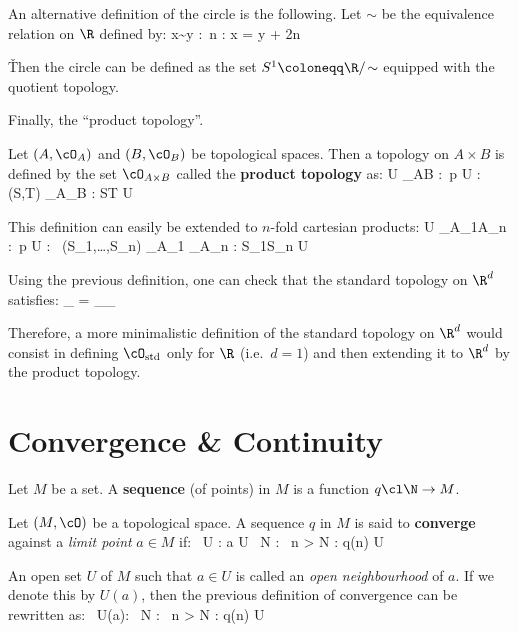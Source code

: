 An alternative definition of the circle is the following. Let $\sim$ be the equivalence relation on $\R$ defined by:
\bse
x\sim y :\eqv \exists \, n \in \Z : x = y + 2\pi n
\ese

\v

Then the circle can be defined as the set $S^1 \coloneqq \R/\!\sim$ equipped with the quotient topology.
\ee

Finally, the ``product topology''.

Let $(A,\cO_A)$ and $(B,\cO_B)$ be topological spaces. Then a topology on $A\times B$ is defined by the set
$\cO_{A\times B}$ called the \textbf{product topology} as:
\bse
U \in \cO_{A\times B} :\eqv \forall \, p \in U : \exists \, (S,T) \in \cO_A\times \cO_B : S\times T \se U
\ese
\ed

This definition can easily be extended to $n$-fold cartesian products:
\bse
U \in \cO_{A_1\times \cdots \times A_n} :\eqv \forall \, p \in U : \exists \, (S_1,\ldots,S_n) \in \cO_{A_1}\times
\cdots \times \cO_{A_n} : S_1\times \cdots\times S_n \se U
\ese

Using the previous definition, one can check that the standard topology on $\R^d$ satisfies:
\bse
\cO_ = \cO_{\underbrace{\scriptstyle \R\times\R\times\cdots\times\R}_}
\ese

Therefore, a more minimalistic definition of the standard topology on $\R^d$ would consist in defining
$\cO_\mathrm{std}$ only for $\R$ (i.e.\ $d=1$) and then extending it to $\R^d$ by the product topology.

\section{Convergence \& Continuity}

\bd [Sequence]
Let $M$ be a set. A \textbf{sequence} (of points) in $M$ is a function $q \cl \N \to M$.
\ed

\bd [Convergence]
Let $(M,\cO)$ be a topological space. A sequence $q$ in $M$ is said to \textbf{converge} against a \emph{limit point}
$a\in M$ if:
\bse
\forall \, U \in \cO : a \in U \imp \exists \, N \in \N : \forall \, n > N : q(n) \in U
\ese
\ed

An open set $U$ of $M$ such that $a\in U$ is called an \emph{open neighbourhood} of $a$. If we denote this by $U(a)$,
then the previous definition of convergence can be rewritten as:
\bse
\forall \, U(a): \exists \, N \in \N : \forall \, n > N : q(n) \in U
\ese
\be


